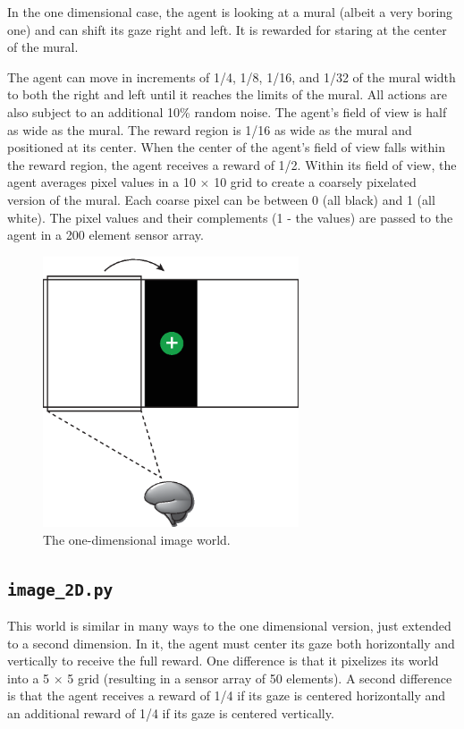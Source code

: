 In the one dimensional case, the agent is looking at a mural (albeit a very boring one) and can shift its gaze right and left. It is rewarded for staring at the center of the mural.

The agent can move in increments of 1/4, 1/8, 1/16, and 1/32 of the mural width to both the right and left until it reaches the limits of the mural. All actions are also subject to an additional 10\% random noise. The agent's field of view is half as wide as the mural. The reward region is 1/16 as wide as the mural and positioned at its center. When the center of the agent's field of view falls within the reward region, the agent receives a reward of 1/2. Within its field of view, the agent averages pixel values in a 10 $\times$ 10 grid to create a coarsely pixelated version of the mural. Each coarse pixel can be between 0 (all black) and 1 (all white). The pixel values and their complements (1 - the values) are passed to the agent in a 200 element sensor array.

\begin{figure}
\centering
\includegraphics[height=8cm]{figs/image_world_1D.eps}
\caption{The one-dimensional image world.}
\label{image_1D}
\end{figure}

\subsection{\texttt{image\_2D.py}}

This world is similar in many ways to the one dimensional version, just extended to a second dimension. In it, the agent must center its gaze both horizontally and vertically to receive the full reward. One difference is that it pixelizes its world into a 5 $\times$ 5 grid (resulting in a sensor array of 50 elements). A second difference is that the agent receives a reward of 1/4 if its gaze is centered horizontally and an additional reward of 1/4 if its gaze is centered vertically. 

